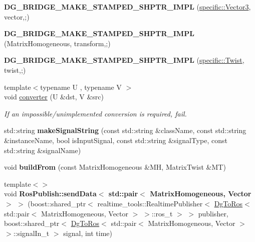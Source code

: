 \begin{DoxyCompactItemize}
\item 
{\bfseries D\+G\+\_\+\+B\+R\+I\+D\+G\+E\+\_\+\+M\+A\+K\+E\+\_\+\+S\+T\+A\+M\+P\+E\+D\+\_\+\+S\+H\+P\+T\+R\+\_\+\+I\+M\+PL} (\hyperlink{classdynamic__graph_1_1specific_1_1Vector3}{specific\+::\+Vector3}, vector,;)\hypertarget{namespacedynamic__graph_a959196c1e676ca84b2e1b7c2dda8e982}{}\label{namespacedynamic__graph_a959196c1e676ca84b2e1b7c2dda8e982}

\item 
{\bfseries D\+G\+\_\+\+B\+R\+I\+D\+G\+E\+\_\+\+M\+A\+K\+E\+\_\+\+S\+T\+A\+M\+P\+E\+D\+\_\+\+S\+H\+P\+T\+R\+\_\+\+I\+M\+PL} (Matrix\+Homogeneous, transform,;)\hypertarget{namespacedynamic__graph_a724ed2c3a6a902fc23526ffadc0b864a}{}\label{namespacedynamic__graph_a724ed2c3a6a902fc23526ffadc0b864a}

\item 
{\bfseries D\+G\+\_\+\+B\+R\+I\+D\+G\+E\+\_\+\+M\+A\+K\+E\+\_\+\+S\+T\+A\+M\+P\+E\+D\+\_\+\+S\+H\+P\+T\+R\+\_\+\+I\+M\+PL} (\hyperlink{classdynamic__graph_1_1specific_1_1Twist}{specific\+::\+Twist}, twist,;)\hypertarget{namespacedynamic__graph_a8b3e9c1129e4232f6db8ed3cb2a0496f}{}\label{namespacedynamic__graph_a8b3e9c1129e4232f6db8ed3cb2a0496f}

\item 
{\footnotesize template$<$typename U , typename V $>$ }\\void \hyperlink{namespacedynamic__graph_a38ff488b8b21c0b4f4d7f44572fa4ee5}{converter} (U \&dst, V \&src)
\begin{DoxyCompactList}\small\item\em If an impossible/unimplemented conversion is required, fail. \end{DoxyCompactList}\item 
std\+::string {\bfseries make\+Signal\+String} (const std\+::string \&class\+Name, const std\+::string \&instance\+Name, bool is\+Input\+Signal, const std\+::string \&signal\+Type, const std\+::string \&signal\+Name)\hypertarget{namespacedynamic__graph_a5e89dc0ac6a2d2c1368c7d4617585f6b}{}\label{namespacedynamic__graph_a5e89dc0ac6a2d2c1368c7d4617585f6b}

\item 
void {\bfseries build\+From} (const Matrix\+Homogeneous \&MH, Matrix\+Twist \&MT)\hypertarget{namespacedynamic__graph_a8023711282c3d038a68202b12d5279d6}{}\label{namespacedynamic__graph_a8023711282c3d038a68202b12d5279d6}

\item 
{\footnotesize template$<$$>$ }\\void {\bfseries Ros\+Publish\+::send\+Data$<$ std\+::pair$<$ Matrix\+Homogeneous, Vector $>$ $>$} (boost\+::shared\+\_\+ptr$<$ realtime\+\_\+tools\+::\+Realtime\+Publisher$<$ \hyperlink{classdynamic__graph_1_1DgToRos}{Dg\+To\+Ros}$<$ std\+::pair$<$ Matrix\+Homogeneous, Vector $>$ $>$\+::ros\+\_\+t $>$ $>$ publisher, boost\+::shared\+\_\+ptr$<$ \hyperlink{classdynamic__graph_1_1DgToRos}{Dg\+To\+Ros}$<$ std\+::pair$<$ Matrix\+Homogeneous, Vector $>$ $>$\+::signal\+In\+\_\+t $>$ signal, int time)\hypertarget{namespacedynamic__graph_a3be0829bb3bf40c74c6d0e066f776902}{}\label{namespacedynamic__graph_a3be0829bb3bf40c74c6d0e066f776902}

\end{DoxyCompactItemize}
